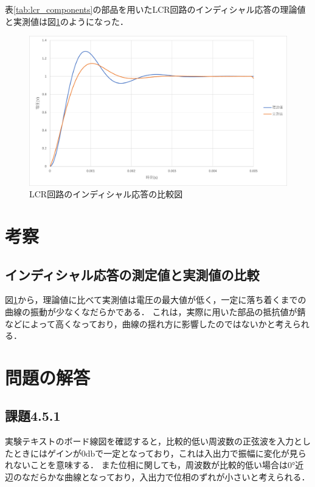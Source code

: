 \documentclass{jlreq}
\numberwithin{equation}{section}
\begin{document}
表\ref{tab:lcr_components}の部品を用いたLCR回路のインディシャル応答の理論値と実測値は図\ref{fig:lcr_indicial_without_opamp}のようになった．
\begin{figure}[H]
  \centering
  \includegraphics[width=\textwidth]{assets/lcr_indicial_without_opamp.png}
  \caption{LCR回路のインディシャル応答の比較図}
  \label{fig:lcr_indicial_without_opamp}
\end{figure}

\section{考察}
\subsection{インディシャル応答の測定値と実測値の比較}
図\ref{fig:lcr_indicial_without_opamp}から，理論値に比べて実測値は電圧の最大値が低く，一定に落ち着くまでの曲線の振動が少なくなだらかである．
これは，実際に用いた部品の抵抗値が錆などによって高くなっており，曲線の揺れ方に影響したのではないかと考えられる．

\subsection{}

\section{問題の解答}
\subsection*{課題4.5.1}
実験テキストのボード線図を確認すると，比較的低い周波数の正弦波を入力としたときにはゲインが$0 \si{\decibel}$で一定となっており，これは入出力で振幅に変化が見られないことを意味する．
また位相に関しても，周波数が比較的低い場合は$0 \si{\degree}$近辺のなだらかな曲線となっており，入出力で位相のずれが小さいと考えられる．
\end{document}
